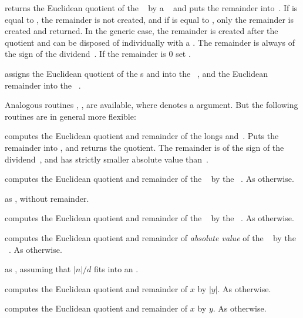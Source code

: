  returns the Euclidean quotient of the
~ by a ~ and puts the remainder
into~. If  is equal to , the remainder is not
created, and if  is equal to  , only the remainder is
created and returned. In the generic case, the remainder is created after the
quotient and can be disposed of individually with a . The
remainder is always of the sign of the dividend~. If the remainder
is $0$ set .

 assigns the Euclidean
quotient of the s  and  into the ~,
and the Euclidean remainder into the ~.

\noindent Analogous routines \kbd{[z]}, \kbd{[z]},
\kbd{[z]} are available, where  denotes a 
argument. But the following routines are in general more flexible:

 computes the Euclidean
quotient and remainder of the longs  and~. Puts the remainder
into , and returns the quotient. The remainder is of the sign of the
dividend~, and has strictly smaller absolute value than~.

 computes the Euclidean
quotient and remainder of the ~ by the ~. As
 otherwise.

 as , without
remainder.

 computes the Euclidean quotient
and remainder of the ~ by the ~. As
 otherwise.

 computes the Euclidean quotient
and remainder of \emph{absolute value} of the ~ by the
~. As  otherwise.

 as , assuming
that $|n|/d$ fits into an .

computes the Euclidean quotient and remainder of $x$ by $|y|$. As
 otherwise.

computes the Euclidean quotient and remainder of $x$ by $y$. As
 otherwise.

